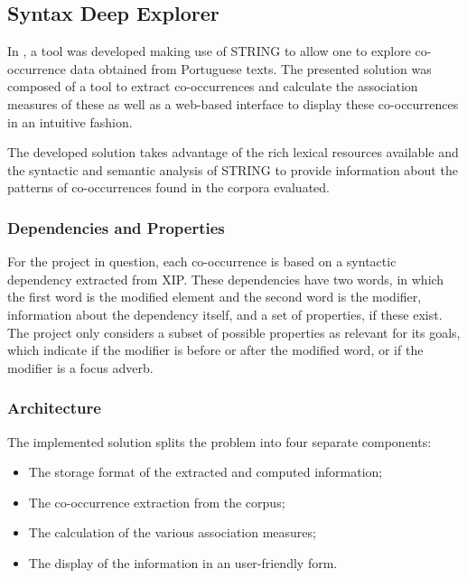 \subsection{Syntax Deep Explorer}

In \citet{correia2015syntax}, a tool was developed making use of \ac{STRING} to
allow one to explore co-occurrence data obtained from Portuguese texts. The
presented solution was composed of a tool to extract co-occurrences and
calculate the association measures of these as well as a web-based interface to
display these co-occurrences in an intuitive fashion.

The developed solution takes advantage of the rich lexical resources available
and the syntactic and semantic analysis of \ac{STRING} to provide information
about the patterns of co-occurrences found in the corpora evaluated.

\subsubsection*{Dependencies and Properties}

For the project in question, each co-occurrence is based on a syntactic
dependency extracted from \ac{XIP}. These dependencies have two words, in which
the first word is the modified element and the second word is the modifier,
information about the dependency itself, and a set of properties, if these
exist. The project only considers a subset of possible properties as 
relevant for its goals, which indicate if the modifier is before or after the 
modified word, or if the modifier is a focus adverb.


\subsubsection*{Architecture}

The implemented solution splits the problem into four separate components:

\begin{itemize}
 \item The storage format of the extracted and computed information;
 \item The co-occurrence extraction from the corpus;
 \item The calculation of the various association measures;
 \item The display of the information in an user-friendly form.
\end{itemize}

